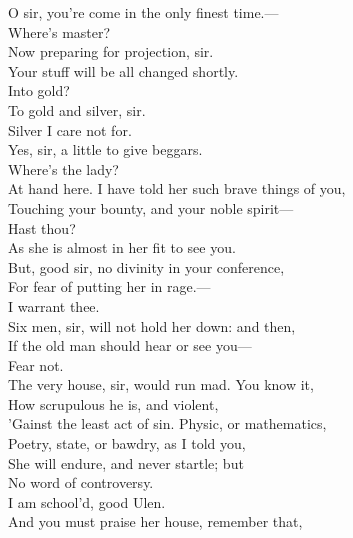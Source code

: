 \documentclass[a4paper,oneside]{memoir}
\begin{document}
\begin{drama*}
\facespeaks O sir, you're come in the only finest time.---\\
\mammonspeaks Where's master?\\
\facespeaks {} Now preparing for projection, sir.\\
Your stuff will be all changed shortly.\\
\mammonspeaks {} Into gold?\\
\facespeaks To gold and silver, sir.\\
\mammonspeaks {} Silver I care not for.\\
\facespeaks Yes, sir, a little to give beggars.\\
\mammonspeaks {} Where's the lady?\\
\facespeaks At hand here. I have told her such brave things of you,\\
Touching your bounty, and your noble spirit---\\
\mammonspeaks Hast thou?\\
\facespeaks {} As she is almost in her fit to see you.\\
But, good sir, no divinity in your conference,\\
For fear of putting her in rage.---\\
\mammonspeaks {} I warrant thee.\\
\facespeaks Six men, sir, will not hold her down: and then,\\
If the old man should hear or see you---\\
\mammonspeaks {} Fear not.\\
\facespeaks The very house, sir, would run mad. You know it,\\
How scrupulous he is, and violent,\\
'Gainst the least act of sin. Physic, or mathematics,\\
Poetry, state, or bawdry, as I told you,\\
She will endure, and never startle; but\\
No word of controversy.\\
\mammonspeaks {} I am school'd, good Ulen.\\
\facespeaks And you must praise her house, remember that,\\

\end{drama*}
\end{document}
